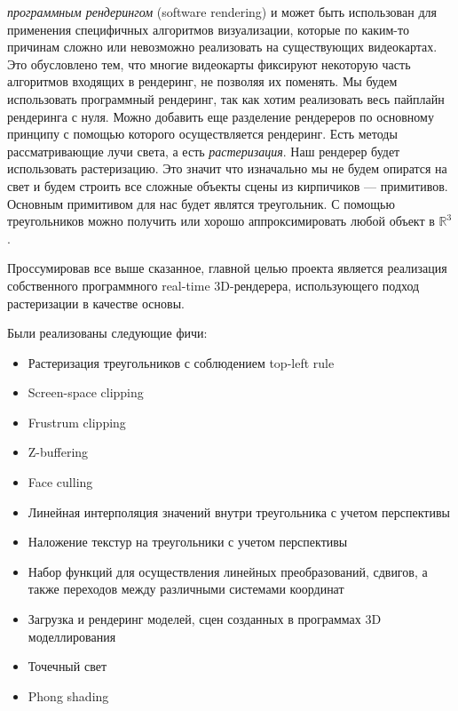 \documentclass{article}
\begin{document}
\emph{программным рендерингом} (software rendering) и может быть 
использован для применения специфичных алгоритмов визуализации, которые 
по каким-то причинам сложно или невозможно реализовать на существующих видеокартах.
Это обусловлено тем, что многие видеокарты фиксируют некоторую 
часть алгоритмов входящих в рендеринг, не позволяя их поменять.
Мы будем использовать программный рендеринг, так как хотим 
реализовать весь пайплайн рендеринга с нуля. Можно добавить еще 
разделение рендереров по основному принципу с помощью которого осуществляется рендеринг. 
Есть методы рассматривающие 
лучи света, а есть \emph{растеризация}. Наш рендерер будет использовать растеризацию. 
Это значит что изначально мы не будем опиратся на свет и будем 
строить все сложные объекты сцены из кирпичиков --- примитивов. 
Основным примитивом для нас будет являтся треугольник. С помощью 
треугольников можно получить или хорошо аппроксимировать любой 
объект в $\mathbb{R}^3$.

Проссумировав все выше сказанное, главной целью проекта является реализация собственного программного real-time 
3D-рендерера, использующего подход растеризации в качестве основы.

Были реализованы следующие фичи:
\begin{itemize}
    \item Растеризация треугольников с соблюдением top-left rule 
    \item Screen-space clipping
    \item Frustrum clipping
    \item Z-buffering
    \item Face culling
    \item Линейная интерполяция значений внутри треугольника с учетом перспективы
    \item Наложение текстур на треугольники с учетом перспективы
    \item Набор функций для осуществления линейных преобразований, сдвигов, а также 
    переходов между различными системами координат 
    \item Загрузка и рендеринг моделей, сцен созданных в программах 3D моделлирования 
    \item Точечный свет 
    \item Phong shading
\end{itemize}
\end{document}
